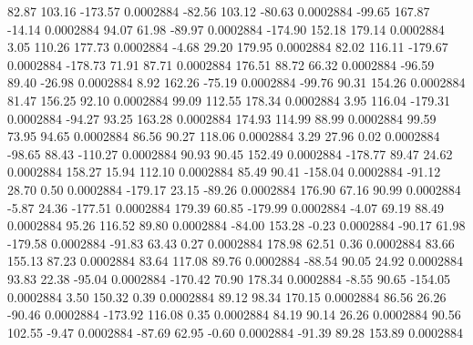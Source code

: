        82.87      103.16     -173.57     0.0002884
      -82.56      103.12      -80.63     0.0002884
      -99.65      167.87      -14.14     0.0002884
       94.07       61.98      -89.97     0.0002884
     -174.90      152.18      179.14     0.0002884
        3.05      110.26      177.73     0.0002884
       -4.68       29.20      179.95     0.0002884
       82.02      116.11     -179.67     0.0002884
     -178.73       71.91       87.71     0.0002884
      176.51       88.72       66.32     0.0002884
      -96.59       89.40      -26.98     0.0002884
        8.92      162.26      -75.19     0.0002884
      -99.76       90.31      154.26     0.0002884
       81.47      156.25       92.10     0.0002884
       99.09      112.55      178.34     0.0002884
        3.95      116.04     -179.31     0.0002884
      -94.27       93.25      163.28     0.0002884
      174.93      114.99       88.99     0.0002884
       99.59       73.95       94.65     0.0002884
       86.56       90.27      118.06     0.0002884
        3.29       27.96        0.02     0.0002884
      -98.65       88.43     -110.27     0.0002884
       90.93       90.45      152.49     0.0002884
     -178.77       89.47       24.62     0.0002884
      158.27       15.94      112.10     0.0002884
       85.49       90.41     -158.04     0.0002884
      -91.12       28.70        0.50     0.0002884
     -179.17       23.15      -89.26     0.0002884
      176.90       67.16       90.99     0.0002884
       -5.87       24.36     -177.51     0.0002884
      179.39       60.85     -179.99     0.0002884
       -4.07       69.19       88.49     0.0002884
       95.26      116.52       89.80     0.0002884
      -84.00      153.28       -0.23     0.0002884
      -90.17       61.98     -179.58     0.0002884
      -91.83       63.43        0.27     0.0002884
      178.98       62.51        0.36     0.0002884
       83.66      155.13       87.23     0.0002884
       83.64      117.08       89.76     0.0002884
      -88.54       90.05       24.92     0.0002884
       93.83       22.38      -95.04     0.0002884
     -170.42       70.90      178.34     0.0002884
       -8.55       90.65     -154.05     0.0002884
        3.50      150.32        0.39     0.0002884
       89.12       98.34      170.15     0.0002884
       86.56       26.26      -90.46     0.0002884
     -173.92      116.08        0.35     0.0002884
       84.19       90.14       26.26     0.0002884
       90.56      102.55       -9.47     0.0002884
      -87.69       62.95       -0.60     0.0002884
      -91.39       89.28      153.89     0.0002884
